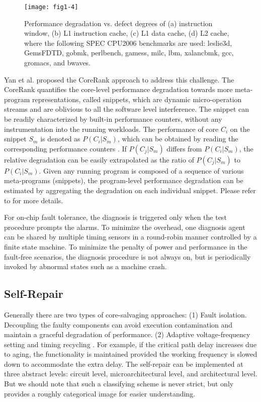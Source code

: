 \begin{figure}[t]
\centering
\texttt{[image: fig1-4]}
\caption{Performance degradation vs. defect degrees of (a) instruction window, (b) L1 instruction cache, (c) L1 data cache, (d) L2 cache, where the following SPEC CPU2006 benchmarks are used: leslie3d, GemsFDTD, gobmk, perlbench, gamess, milc, lbm, xalancbmk, gcc, gromacs, and bwaves.}
\label{fig:performance-degradation} 
\end{figure}


Yan et al. \cite{yan2015corerank} proposed the CoreRank approach to address this challenge. The CoreRank quantifies the core-level performance degradation towards more meta-program representations, called snippets, which are dynamic micro-operation streams and are oblivious to all the software level interference. The snippet can be readily characterized by built-in performance counters, without any instrumentation into the running workloads. The performance of core $C_i$ on the snippet $S_m$ is denoted as $P(C_{i}|S_{m})$, which can be obtained by reading the corresponding performance counters \cite{eyerman2007top}. If $P(C_{j}|S_{m})$ differs from $P(C_{i}|S_{m})$, the relative degradation can be easily extrapolated as the ratio of $P(C_{j}|S_{m})$ to $P(C_{i}|S_{m})$. Given any running program is composed of a sequence of various meta-programs (snippets), the program-level performance degradation can be estimated by aggregating the degradation on each individual snippet. Please refer to \cite{yan2015corerank} for more details.

For on-chip fault tolerance, the diagnosis is triggered only when the test procedure prompts the alarms. To minimize the overhead, one diagnosis agent can be shared by multiple timing sensors in a round-robin manner \cite{ReviveNet} controlled by a finite state machine. To minimize the penalty of power and performance in the fault-free scenarios, the diagnosis procedure is not always on, but is periodically invoked by abnormal states such as a machine crash.

\subsection{Self-Repair}
Generally there are two types of core-salvaging approaches: (1) Fault isolation. Decoupling the faulty components \cite{aitken2012yield} can avoid execution contamination and maintain a graceful degradation of performance. (2) Adaptive voltage-frequency setting and timing recycling \cite{tschanz201045nm}. For example, if the critical path delay increases due to aging, the functionality is maintained provided the working frequency is slowed down to accommodate the extra delay. The self-repair can be implemented at three abstract levels: circuit level, microarchitectural level, and architectural level. But we should note that such a classifying scheme is never strict, but only provides a roughly categorical image for easier understanding.

